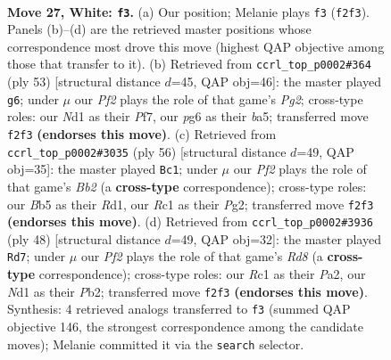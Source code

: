 \documentclass[11pt]{article}
\begin{document}
\clearpage

\begin{figure}[p]\centering
\begin{subfigure}{0.46\textwidth}\centering
\resizebox{\linewidth}{!}{%
\newchessgame
\chessboard[
  setfen={1nb4r/6k1/1p2p1p1/1B2P1N1/5pp1/8/r1P2PP1/2RN1K2 w - - 0 27},
  showmover=false,
  pgfstyle=straightmove, color=movearrow, markmove={f2-f3}
]}
\caption{}
\end{subfigure}\hfill
\begin{subfigure}{0.46\textwidth}\centering
\resizebox{\linewidth}{!}{%
\newchessgame
\chessboard[
  setfen={6k1/3r1pp1/8/Bn1p3p/b1p4P/P1P3P1/5PBK/2R5 b - - 1 27},
  showmover=false,
  pgfstyle=straightmove, color=movearrow, markmove={g7-g6}
]}
\caption{}
\end{subfigure}
\\[4pt]
\begin{subfigure}{0.46\textwidth}\centering
\resizebox{\linewidth}{!}{%
\newchessgame
\chessboard[
  setfen={2r2k2/5p1p/p1P3pb/n3P3/Pp1N4/8/1B3PPP/3R1K2 w - - 5 29},
  showmover=false,
  pgfstyle=straightmove, color=movearrow, markmove={b2-c1}
]}
\caption{}
\end{subfigure}\hfill
\begin{subfigure}{0.46\textwidth}\centering
\resizebox{\linewidth}{!}{%
\newchessgame
\chessboard[
  setfen={3R4/pbr1npkp/1p2p3/4N1p1/2P5/6P1/PP1KBP1P/8 w - - 1 25},
  showmover=false,
  pgfstyle=straightmove, color=movearrow, markmove={d8-d7}
]}
\caption{}
\end{subfigure}
\caption{\textbf{Move 27, White: \texttt{f3}.} (a) Our position; Melanie plays \texttt{f3} (\texttt{f2f3}). Panels (b)--(d) are the retrieved master positions whose correspondence most drove this move (highest QAP objective among those that transfer to it). (b) Retrieved from \texttt{ccrl\_top\_p0002\#364} (ply 53) [structural distance $d$=45, QAP obj=46]: the master played \texttt{g6}; under $\mu$ our \emph{Pf2} plays the role of that game's \emph{Pg2}; cross-type roles: our \emph{N}d1 as their \emph{P}f7, our \emph{p}g6 as their \emph{b}a5; transferred move \texttt{f2f3} \textbf{(endorses this move)}. (c) Retrieved from \texttt{ccrl\_top\_p0002\#3035} (ply 56) [structural distance $d$=49, QAP obj=35]: the master played \texttt{Bc1}; under $\mu$ our \emph{Pf2} plays the role of that game's \emph{Bb2} (a \textbf{cross-type} correspondence); cross-type roles: our \emph{B}b5 as their \emph{R}d1, our \emph{R}c1 as their \emph{P}g2; transferred move \texttt{f2f3} \textbf{(endorses this move)}. (d) Retrieved from \texttt{ccrl\_top\_p0002\#3936} (ply 48) [structural distance $d$=49, QAP obj=32]: the master played \texttt{Rd7}; under $\mu$ our \emph{Pf2} plays the role of that game's \emph{Rd8} (a \textbf{cross-type} correspondence); cross-type roles: our \emph{R}c1 as their \emph{P}a2, our \emph{N}d1 as their \emph{P}b2; transferred move \texttt{f2f3} \textbf{(endorses this move)}. Synthesis: 4 retrieved analogs transferred to \texttt{f3} (summed QAP objective 146, the strongest correspondence among the candidate moves); Melanie committed it via the \texttt{search} selector.}
\label{fig:thought-m52}
\end{figure}
\end{document}
